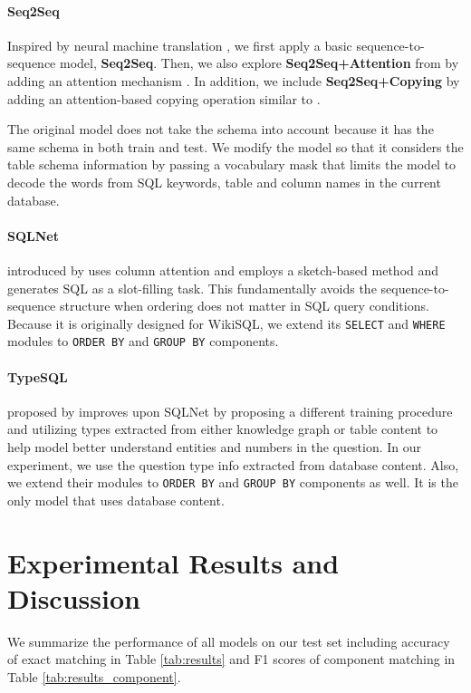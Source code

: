 \documentclass[11pt,a4paper]{article}
\begin{document}
\paragraph{Seq2Seq}
Inspired by neural machine translation \cite{sutskever2014sequence}, we first apply a basic sequence-to-sequence model, \textbf{Seq2Seq}.
Then, we also explore \textbf{Seq2Seq+Attention} from \cite{dong16} by adding an attention mechanism \cite{bahdanau2015neural}.
In addition, we include \textbf{Seq2Seq+Copying} by adding an attention-based copying operation similar to \cite{jia2016}.


The original model does not take the schema into account because it has the same schema in both train and test. We modify the model so that it considers the table schema information by passing a vocabulary mask that limits the model to decode the words from SQL keywords, table and column names in the current database.

\paragraph{SQLNet}
introduced by \cite{Xu2017} uses column attention and employs a sketch-based method and generates SQL as a slot-filling task.
This fundamentally avoids the sequence-to-sequence structure when ordering does not matter in SQL query conditions.
Because it is originally designed for WikiSQL, we extend its \texttt{SELECT} and \texttt{WHERE} modules to \texttt{ORDER BY} and \texttt{GROUP BY} components.
 
\paragraph{TypeSQL} proposed by \cite{Yu18} improves upon SQLNet by proposing a different training procedure and utilizing types extracted from either knowledge graph or table content to help model better understand entities and numbers in the question.
In our experiment, we use the question type info extracted from database content. Also, we extend their modules to \texttt{ORDER BY} and \texttt{GROUP BY} components as well. It is the only model that uses database content.


\section{Experimental Results and Discussion}
We summarize the performance of all models on our test set including accuracy of exact matching in Table \ref{tab:results} and F1 scores of component matching in Table \ref{tab:results_component}.
\end{document}
